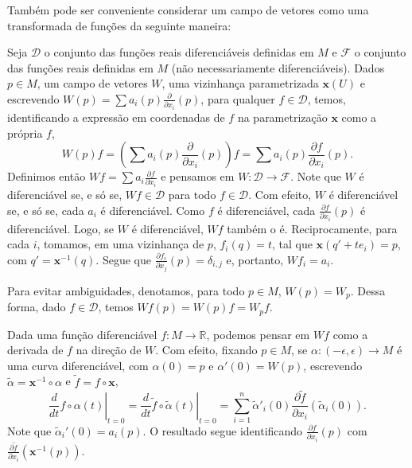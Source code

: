 Também pode ser conveniente considerar um campo de vetores como uma transformada de funções da seguinte maneira:
\begin{observation}
    \label{loc:5.1_:_def_8_:_campos_de_vetores.campo_de_vetores_como_uma_transformada.}
    Seja $\mathcal{D}$ o conjunto das funções reais diferenciáveis definidas em $M$ e $\mathcal{F}$ o conjunto das funções reais definidas em $M$ (não necessariamente diferenciáveis).
    Dados $p \in M$, um campo de vetores $W$, uma vizinhança parametrizada $\mathbf{x}(U)$ e escrevendo $W(p)=\sum a_{i}(p)\frac{\partial}{\partial x_{i}}(p)$, para qualquer $f \in \mathcal{D}$, temos, identificando a expressão em coordenadas de $f$ na parametrização $\mathbf{x}$ como a própria $f$,
    \begin{equation*}
        W(p)f=(\sum a_{i}(p)\frac{\partial }{\partial x_{i}}(p))f=\sum a_{i}(p)\frac{\partial f}{\partial x_{i}}(p).
    \end{equation*}
    Definimos então $Wf=\sum a_{i}\frac{\partial f}{\partial x_{i}}$ e pensamos em $W:\mathcal{D}\to \mathcal{F}$.
    Note que $W$ é diferenciável se, e só se, $Wf \in \mathcal{D}$ para todo $f \in \mathcal{D}$. Com efeito, $W$ é diferenciável se, e só se, cada $a_{i}$ é diferenciável. Como $f$ é diferenciável, cada $\frac{\partial f}{\partial x_{i}}(p)$ é diferenciável. Logo, se $W$ é diferenciável, $Wf$ também o é. Reciprocamente, para cada $i$, tomamos, em uma vizinhança de $p$, $f_{i}(q)=t$, tal que $\mathbf{x}(q'+te_{i})=p$, com $q'=\mathbf{x}^{-1}(q)$. Segue que $\frac{\partial f_{i}}{\partial x_{j}}(p)=\delta_{i,j}$ e, portanto, $Wf_{i}=a_{i}$.

    Para evitar ambiguidades, denotamos, para todo $p \in M$, $W(p)=W_{p}$. Dessa forma, dado $f \in \mathcal{D}$, temos $Wf(p)=W(p)f=W_{p}f$.
\end{observation}
Dada uma função diferenciável $f:M\to \mathbb{R}$, podemos pensar em $Wf$ como a derivada de $f$ na direção de $W$. Com efeito, fixando $p \in M$, se $\alpha:(-\epsilon, \epsilon)\to M$ é uma curva diferenciável, com $\alpha(0)=p$ e $\alpha'(0)=W(p)$, escrevendo $\tilde{\alpha}=\mathbf{x}^{-1} \circ\alpha$ e $\tilde{f}=f \circ \mathbf{x}$,
\begin{equation*}
    \left.\frac{d}{dt}f \circ \alpha(t)\right|_{t=0}= \left.\frac{d}{dt}\tilde{f} \circ  \tilde{\alpha}(t)\right|_{t=0}=\sum_{i=1}^{n}\tilde{\alpha}'_{i}(0)\frac{\partial \tilde{f}}{\partial x_{i}}(\tilde{\alpha}_{i}(0)).
\end{equation*}
Note que $\tilde{\alpha}_{i}'(0)=a_{i}(p)$. O resultado segue identificando $\frac{\partial f}{\partial x_{i}}(p)$ com $\frac{\partial \tilde{f}}{\partial x_{i}}(\mathbf{x}^{-1}(p))$.

